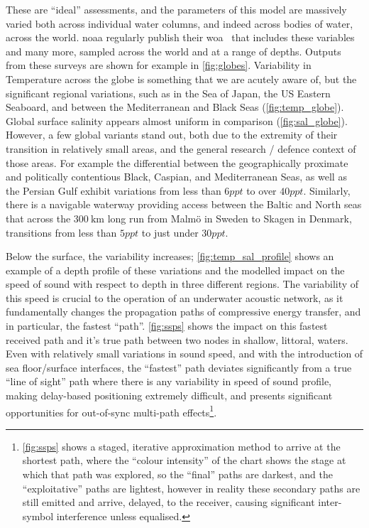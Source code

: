 These are ``ideal'' assessments, and the parameters of this model are massively varied both across individual water columns, and indeed across bodies of water, across the world. 
\gls{noaa} regularly publish their \gls{woa}~\cite{Locarnini2013,Zweng2013} that includes these variables and many more, sampled across the world and at a range of depths. 
Outputs from these surveys are shown for example in \autoref{fig:globes}. 
Variability in Temperature across the globe is something that we are acutely aware of, but the significant regional variations, such as in the Sea of Japan, the US Eastern Seaboard, and between the Mediterranean and Black Seas (\autoref{fig:temp_globe}).
Global surface salinity appears almost uniform in comparison (\autoref{fig:sal_globe}).
However, a few global variants stand out, both due to the extremity of their transition in relatively small areas, and the general research / defence context of those areas. 
For example the differential between the geographically proximate and politically contentious Black, Caspian, and Mediterranean Seas, as well as the Persian Gulf exhibit variations from less than $6ppt$ to over $40ppt$.
Similarly, there is a navigable waterway providing access between the Baltic and North seas that across the $\SI{300}{\kilo\meter}$ long run from Malm{\"o} in Sweden to Skagen in Denmark, transitions from less than $5ppt$ to just under $30ppt$. 

Below the surface, the variability increases; \autoref{fig:temp_sal_profile} shows an example of a depth profile of these variations and the modelled impact on the speed of sound with respect to depth in three different regions. 
The variability of this speed is crucial to the operation of an underwater acoustic network, as it fundamentally changes the propagation paths of compressive energy transfer, and in particular, the fastest ``path''. 
\autoref{fig:ssps} shows the impact on this fastest received path and it's true path between two nodes in shallow, littoral, waters.
Even with relatively small variations in sound speed, and with the introduction of sea floor/surface interfaces, the ``fastest'' path deviates significantly from a true ``line of sight'' path where there is any variability in speed of sound profile, making delay-based positioning extremely difficult, and presents significant opportunities for out-of-sync multi-path effects\footnote{\autoref{fig:ssps} shows a staged, iterative approximation method to arrive at the shortest path, where the ``colour intensity'' of the chart shows the stage at which that path was explored, so the ``final'' paths are darkest, and the ``exploitative'' paths are lightest, however in reality these secondary paths are still emitted and arrive, delayed, to the receiver, causing significant inter-symbol interference unless equalised.}.

